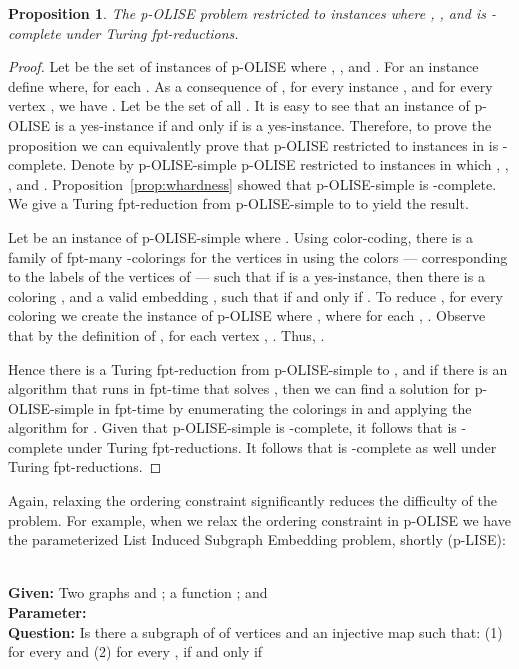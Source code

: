 \documentclass[11pt]{article}
\newtheorem{proposition}[theorem]{Proposition}
\newcommand{\paramproblem}[4]{\noindent {\sc #1}
\\
{\bf Given:} #2\\
{\bf Parameter:} #3\\
{\bf Question:} #4}
\begin{document}
\begin{proposition}\label{prop:whardness2}
The p-OLISE problem restricted to instances where , , and  is -complete under Turing fpt-reductions.
\end{proposition}

\begin{proof}
Let  be the set of instances of p-OLISE where , , and .  For an instance  define  where, for each . As a consequence of , for every instance , and for every vertex , we have . Let  be the set of all .  It is easy to see that an instance of p-OLISE  is a yes-instance if and only if  is a yes-instance.  Therefore, to prove the proposition we can equivalently prove that p-OLISE restricted to instances in  is -complete.  Denote by p-OLISE-simple p-OLISE restricted to instances in which , , , and .  Proposition~\ref{prop:whardness} showed that p-OLISE-simple is -complete.  We give a Turing fpt-reduction from p-OLISE-simple to  to yield the result.

Let  be an instance of p-OLISE-simple where .   Using color-coding, there is a family  of fpt-many -colorings for the vertices in  using the colors  --- corresponding to the labels of the vertices of  --- such that if  is a yes-instance, then there is a coloring , and a valid embedding  , such that  if and only if .  To reduce , for every coloring  we create the instance  of p-OLISE where , where for each , .  Observe that by the definition of , for each vertex , .  Thus, .

Hence there is a Turing fpt-reduction from p-OLISE-simple to , and if there is an algorithm that runs in fpt-time that solves , then we can find a solution for p-OLISE-simple in fpt-time by enumerating the colorings in  and applying the algorithm for . Given that p-OLISE-simple is -complete, it follows that  is -complete under Turing fpt-reductions.  It follows that  is -complete as well under Turing fpt-reductions.
\end{proof}

Again, relaxing the ordering constraint significantly reduces the difficulty of the problem.  For example, when we relax the ordering constraint in p-OLISE we have the parameterized {\sc List Induced Subgraph Embedding} problem, shortly (p-LISE):

\paramproblem{} {Two graphs  and ; a function ; and }{}{Is there a subgraph  of  of  vertices and an injective map  such that: (1)  for every  and (2) for every ,  if and only if } \\
\end{document}
